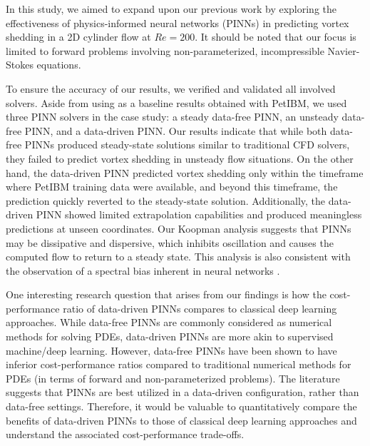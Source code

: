 
In this study, we aimed to expand upon our previous work \cite{chuang_experience_2022} by exploring the effectiveness of physics-informed neural networks (PINNs) in predicting vortex shedding in a 2D cylinder flow at $Re = 200$.
It should be noted that our focus is limited to forward problems involving non-parameterized, incompressible Navier-Stokes equations.

To ensure the accuracy of our results, we verified and validated all involved solvers.
Aside from using as a baseline results obtained with PetIBM, we used three PINN solvers in the case study: a steady data-free PINN, an unsteady data-free PINN, and a data-driven PINN.
Our results indicate that while both data-free PINNs produced steady-state solutions similar to traditional CFD solvers, they failed to predict vortex shedding in unsteady flow situations.
On the other hand, the data-driven PINN predicted vortex shedding only within the timeframe where PetIBM training data were available, and beyond this timeframe, the prediction quickly reverted to the steady-state solution.
Additionally, the data-driven PINN showed limited extrapolation capabilities and produced meaningless predictions at unseen coordinates.
Our Koopman analysis suggests that PINNs may be dissipative and dispersive, which inhibits oscillation and causes the computed flow to return to a steady state.
This analysis is also consistent with the observation of a spectral bias inherent in neural networks \cite{rahaman_spectral_2019}.

One interesting research question that arises from our findings is how the cost-performance ratio of data-driven PINNs compares to classical deep learning approaches.
While data-free PINNs are commonly considered as numerical methods for solving PDEs, data-driven PINNs are more akin to supervised machine/deep learning.
However, data-free PINNs have been shown to have inferior cost-performance ratios compared to traditional numerical methods for PDEs (in terms of forward and non-parameterized problems).
The literature suggests that PINNs are best utilized in a data-driven configuration, rather than data-free settings.
Therefore, it would be valuable to quantitatively compare the benefits of data-driven PINNs to those of classical deep learning approaches and understand the associated cost-performance trade-offs.

